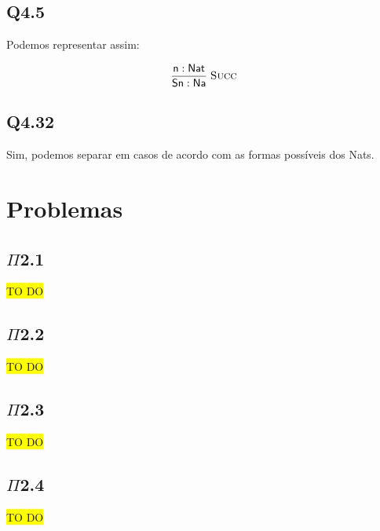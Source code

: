 \documentclass[portuguese,a4paper,12pt]{article}
\begin{document}
	\subsection*{Q4.5}
	
	Podemos representar assim:
	
	\[
	\mathsf{
	\frac{n : Nat}{S n : Na}\;\textsc{Succ}
    }
	\]
	
	\subsection*{Q4.32}
	
	Sim, podemos separar em casos de acordo com as formas possíveis dos Nats.
	
	\section*{\centering Problemas}
	
	\subsection*{$\Pi$2.1}
	
	\colorbox{yellow}{TO DO}
	
	\subsection*{$\Pi$2.2}
	
	\colorbox{yellow}{TO DO}
	
	\subsection*{$\Pi$2.3}
	
	\colorbox{yellow}{TO DO}
	
	\subsection*{$\Pi$2.4}
	
	\colorbox{yellow}{TO DO}
\end{document}
